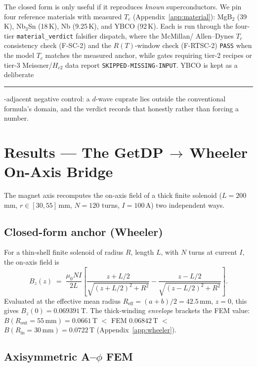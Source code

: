 \documentclass[11pt,a4paper]{article}
\newcommand{\tierdisc}[1]{\textcolor{#1}{\rule[0.05ex]{1.0ex}{1.0ex}}}
\newcommand{\tierRed}{\tierdisc{red!80!black}}
\begin{document}
The closed form is only useful if it reproduces \emph{known}
superconductors. We pin four reference materials with measured $T_c$
(Appendix~\ref{app:material}): MgB$_2$ (39\,K), Nb$_3$Sn (18\,K), Nb
(9.25\,K), and YBCO (92\,K). Each is run through the four-tier
\texttt{material\_verdict} falsifier dispatch, where the McMillan/
Allen--Dynes $T_c$ consistency check (F-SC-2) and the $R(T)$-window
check (F-RTSC-2) \texttt{PASS} when the model $T_c$ matches the
measured anchor, while gates requiring tier-2 recipes or tier-3
Meissner/$H_{c2}$ data report \texttt{SKIPPED-MISSING-INPUT}. YBCO is
kept as a deliberate \tierRed-adjacent negative control: a $d$-wave
cuprate lies outside the conventional formula's domain, and the verdict
records that honestly rather than forcing a number.

\section{Results --- The GetDP\,$\to$\,Wheeler On-Axis Bridge}
\label{sec:results}

The magnet axis recomputes the on-axis field of a thick finite
solenoid ($L\!=\!200$\,mm, $r\!\in\![30,55]$\,mm, $N\!=\!120$ turns,
$I\!=\!100$\,A) two independent ways.

\subsection{Closed-form anchor (Wheeler)}

For a thin-shell finite solenoid of radius $R$, length $L$, with $N$
turns at current $I$, the on-axis field is \citep{jackson1999}
\begin{equation}
B_z(z) \;=\; \frac{\mu_0 N I}{2L}
  \left[\frac{z+L/2}{\sqrt{(z+L/2)^2+R^2}}
      - \frac{z-L/2}{\sqrt{(z-L/2)^2+R^2}}\right].
\label{eq:wheeler}
\end{equation}
Evaluated at the effective mean radius $R_{\text{eff}}\!=\!(a+b)/2\!=\!42.5$\,mm,
$z\!=\!0$, this gives $B_z(0)\!=\!0.069391$\,T. The thick-winding
\emph{envelope} brackets the FEM value:
$B(R_{\text{out}}\!=\!55\,\text{mm})\!=\!0.0661$\,T
$<$ FEM $0.06842$\,T $<$
$B(R_{\text{in}}\!=\!30\,\text{mm})\!=\!0.0722$\,T
(Appendix~\ref{app:wheeler}).

\subsection{Axisymmetric A--$\phi$ FEM}
\end{document}
